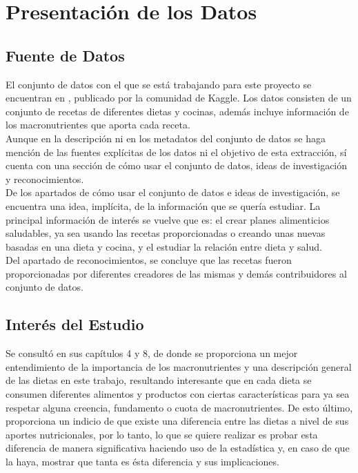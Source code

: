 \documentclass[12pt,a4paper]{article}
\begin{document}
    \newpage
 
    \newpage

    \section{Presentación de los Datos}
    {
        \subsection{Fuente de Datos}
        {
            El conjunto de datos con el que se está trabajando para este proyecto 
            se encuentran en \cite{dataset_macronutrients}, publicado por la comunidad 
            de Kaggle. Los datos consisten de un conjunto de recetas de diferentes 
            dietas y cocinas, además incluye información de los macronutrientes que 
            aporta cada receta.\\
            
            \cite{dataset_macronutrients} Aunque en la descripción ni en los metadatos del conjunto de datos se 
            haga mención de las fuentes explícitas de los datos ni el objetivo de 
            esta extracción, sí cuenta con una sección de cómo usar el conjunto de 
            datos, ideas de investigación y reconocimientos.\\
            
            De los apartados de cómo usar el conjunto de datos e ideas de investigación, 
            se encuentra una idea, implícita, de la información que se quería estudiar. 
            La principal información de interés se vuelve que es: el crear planes 
            alimenticios saludables, ya sea usando las recetas proporcionadas o creando 
            unas nuevas basadas en una dieta y cocina, y el estudiar la relación entre 
            dieta y salud.\\
            
            Del apartado de reconocimientos, se concluye que las recetas fueron 
            proporcionadas por diferentes creadores de las mismas y demás contribuidores 
            al conjunto de datos. 
        }

        \subsection{Interés del Estudio}
        {
            Se consultó \cite{marvastipopular} en sus 
            capítulos 4 y 8, de donde se proporciona un mejor entendimiento de la 
            importancia de los macronutrientes y una descripción general de las 
            dietas en este trabajo, resultando interesante que en cada dieta se 
            consumen diferentes alimentos y productos con ciertas características 
            para ya sea respetar alguna creencia, fundamento o cuota de macronutrientes. 
            De esto último, proporciona un indicio de que existe una diferencia entre 
            las dietas a nivel de sus aportes nutricionales, por lo tanto, lo que se 
            quiere realizar es probar esta diferencia de manera significativa haciendo 
            uso de la estadística y, en caso de que la haya, mostrar que tanta es ésta 
            diferencia y sus implicaciones.
        }

}
\end{document}
